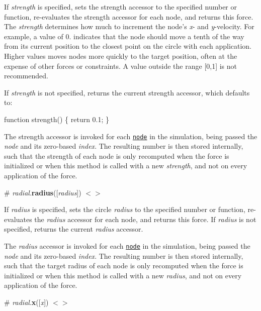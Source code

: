 If {\itshape strength} is specified, sets the strength accessor to the specified number or function, re-\/evaluates the strength accessor for each node, and returns this force. The {\itshape strength} determines how much to increment the node’s {\itshape x}-\/ and {\itshape y}-\/velocity. For example, a value of 0. indicates that the node should move a tenth of the way from its current position to the closest point on the circle with each application. Higher values moves nodes more quickly to the target position, often at the expense of other forces or constraints. A value outside the range \mbox{[}0,1\mbox{]} is not recommended.

If {\itshape strength} is not specified, returns the current strength accessor, which defaults to\+:


\begin{DoxyCode}
function strength() \{
  return 0.1;
\}
\end{DoxyCode}


The strength accessor is invoked for each \href{#simulation_nodes}{\tt node} in the simulation, being passed the {\itshape node} and its zero-\/based {\itshape index}. The resulting number is then stored internally, such that the strength of each node is only recomputed when the force is initialized or when this method is called with a new {\itshape strength}, and not on every application of the force.

\label{_radial_radius}%
\# {\itshape radial}.{\bfseries radius}(\mbox{[}{\itshape radius}\mbox{]}) \href{https://github.com/d3/d3-force/blob/master/src/radial.js}{\tt $<$$>$}

If {\itshape radius} is specified, sets the circle {\itshape radius} to the specified number or function, re-\/evaluates the {\itshape radius} accessor for each node, and returns this force. If {\itshape radius} is not specified, returns the current {\itshape radius} accessor.

The {\itshape radius} accessor is invoked for each \href{#simulation_nodes}{\tt node} in the simulation, being passed the {\itshape node} and its zero-\/based {\itshape index}. The resulting number is then stored internally, such that the target radius of each node is only recomputed when the force is initialized or when this method is called with a new {\itshape radius}, and not on every application of the force.

\label{_radial_x}%
\# {\itshape radial}.{\bfseries x}(\mbox{[}{\itshape x}\mbox{]}) \href{https://github.com/d3/d3-force/blob/master/src/radial.js}{\tt $<$$>$}


